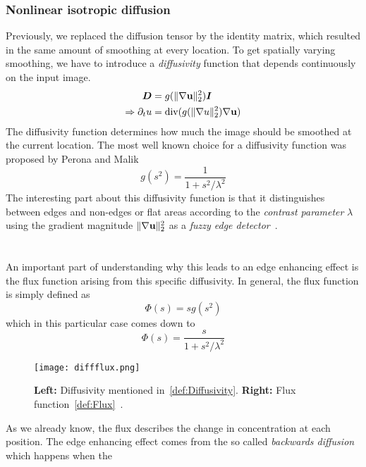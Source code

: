 \subsubsection*{Nonlinear isotropic diffusion}\label{sub:NonIsoDiff}
Previously, we replaced the diffusion tensor by the identity matrix, which resulted in the same
amount of smoothing at every location.
To get spatially varying smoothing, we have to introduce a \textit{diffusivity} function that
depends continuously on the input image. 
\begin{align}
    \boldsymbol D &= g(\lVert\mathbf{\nabla} \mathbf{u}\rVert_2^2)\boldsymbol I\\
    \Rightarrow \partial_t u & = \textnormal{div}(g(\lVert\mathbf{\nabla}
    u\rVert_2^2)\mathbf{\nabla} \mathbf{u})\label{eq:NonIsoDiff}
\end{align}
The diffusivity function determines how much the image should be smoothed at the current location.
The most well known choice for a diffusivity function was proposed by Perona and Malik 
~\cite{perona-malik}
\begin{equation}
    g(s^2) = \frac{1}{1 + s^2/\lambda^2}\label{def:Diffusivity}
\end{equation}
The interesting part about this diffusivity function is that it distinguishes between edges and
non-edges or flat areas according to the \textit{contrast parameter} $\lambda$ using the gradient
magnitude $\lVert\mathbf{\nabla} \mathbf{u}\rVert_2^2$ as a \textit{fuzzy edge detector}~\cite{dic}. \\
\\ \\ 
\noindent An important part of understanding why this leads to an edge enhancing effect is the flux function
arising from this specific diffusivity. In general, the flux function is simply defined as 
\begin{equation}
    \Phi(s) = sg(s^2)
\end{equation}
which in this particular case comes down to
\begin{equation}
    \Phi(s) =\frac{s}{1 + s^2/\lambda^2}\label{def:Flux}
\end{equation}
\begin{figure}
    \texttt{[image: diffflux.png]}
    \caption{\textbf{Left:} Diffusivity mentioned in~\eqref{def:Diffusivity}. \textbf{Right:} Flux
    function~\eqref{def:Flux}~\cite{dic}.}\label{fig:DiffFlux}
\end{figure}
As we already know, the flux describes the change in concentration at each position. The edge
enhancing effect comes from the so called \textit{backwards diffusion} which happens when the
